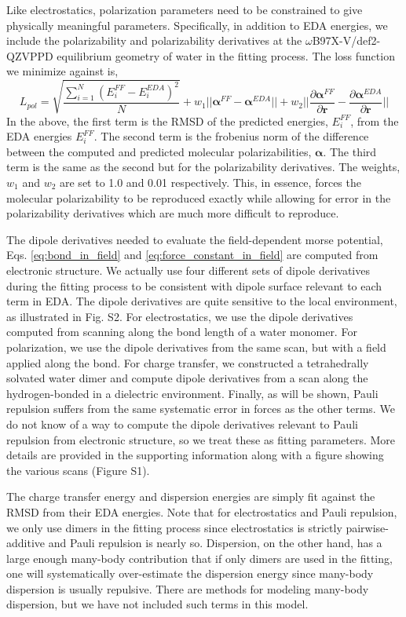 \documentclass[journal=jacsat,manuscript=article]{achemso}
\begin{document}
Like electrostatics, polarization parameters need to be constrained to give physically meaningful parameters. Specifically, in addition to EDA energies, we include the polarizability and polarizability derivatives at the $\omega$B97X-V/def2-QZVPPD equilibrium geometry of water in the fitting process. The loss function we minimize against is,
\begin{equation}
  L_{pol}=\sqrt{\frac{\sum_{i=1}^{N}(E_i^{FF}-E_i^{EDA})^2}{N}} + w_1||\bm{\alpha}^{FF}-\bm{\alpha}^{EDA}||+w_2||\frac{\partial\bm{\alpha}^{FF}}{\partial \bm{r}}-\frac{\partial\bm{\alpha}^{EDA}}{\partial \bm{r}}||
\label{eq:pol_loss}
\end{equation}
\noindent
In the above, the first term is the RMSD of the predicted energies, $E_i^{FF}$, from the EDA energies $E_i^{FF}$. The second term is the frobenius norm of the difference between the computed and predicted molecular polarizabilities, $\bm{\alpha}$. The third term is the same as the second but for the polarizability derivatives. The weights, $w_1$ and $w_2$ are set to 1.0 and 0.01 respectively. This, in essence, forces the molecular polarizability to be reproduced exactly while allowing for error in the polarizability derivatives which are much more difficult to reproduce.

The dipole derivatives needed to evaluate the field-dependent morse potential, Eqs. \ref{eq:bond_in_field} and \ref{eq:force_constant_in_field} are computed from electronic structure. We actually use four different sets of dipole derivatives during the fitting process to be consistent with dipole surface relevant to each term in EDA. The dipole derivatives are quite sensitive to the local environment, as illustrated in Fig. S2. For electrostatics, we use the dipole derivatives computed from scanning along the  bond length of a water monomer. For polarization, we use the dipole derivatives from the same scan, but with a field applied along the  bond. For charge transfer, we constructed a tetrahedrally solvated water dimer and compute dipole derivatives from a scan along the hydrogen-bonded  in a dielectric environment. Finally, as will be shown, Pauli repulsion suffers from the same systematic error in forces as the other terms. We do not know of a way to compute the dipole derivatives relevant to Pauli repulsion from electronic structure, so we treat these as fitting parameters. More details are provided in the supporting information along with a figure showing the various scans (Figure S1).

The charge transfer energy and dispersion energies are simply fit against the RMSD from their EDA energies. Note that for electrostatics and Pauli repulsion, we only use dimers in the fitting process since electrostatics is strictly pairwise-additive and Pauli repulsion is nearly so. Dispersion, on the other hand, has a large enough many-body contribution that if only dimers are used in the fitting, one will systematically over-estimate the dispersion energy since many-body dispersion is usually repulsive. There are methods for modeling many-body dispersion, but we have not included such terms in this model.\cite{anatole2010two,van2018new}
\end{document}
